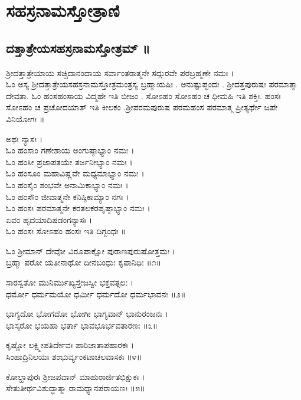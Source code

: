 \fancyhead[RL]{}
\chapter*{\center ಸಹಸ್ರನಾಮಸ್ತೋತ್ರಾಣಿ}
\section{ದತ್ತಾತ್ರೇಯಸಹಸ್ರನಾಮಸ್ತೋತ್ರಮ್ ॥}
ಶ್ರೀದತ್ತಾತ್ರೇಯಾಯ ಸಚ್ಚಿದಾನಂದಾಯ ಸರ್ವಾಂತರಾತ್ಮನೇ ಸದ್ಗುರವೇ ಪರಬ್ರಹ್ಮಣೇ ನಮಃ ।\\
ಓಂ ಅಸ್ಯ ಶ್ರೀದತ್ತಾತ್ರೇಯಸಹಸ್ರನಾಮಸ್ತೋತ್ರಮಂತ್ರಸ್ಯ ಬ್ರಹ್ಮಾಋಷಿಃ . ಅನುಷ್ಟುಪ್ಛಂದಃ . ಶ್ರೀದತ್ತಪುರುಷಃ ಪರಮಾತ್ಮಾ ದೇವತಾ. ಓಂ ಹಂಸಹಂಸಾಯ ವಿದ್ಮಹೇ ಇತಿ ಬೀಜಂ . ಸೋಽಹಂ ಸೋಽಹಂ ಚ ಧೀಮಹಿ ಇತಿ ಶಕ್ತಿಃ. ಹಂಸಃ ಸೋಽಹಂ ಚ ಪ್ರಚೋದಯಾತ್ ಇತಿ ಕೀಲಕಂ .ಶ್ರೀಪರಮಪುರುಷ ಪರಮಹಂಸ ಪರಮಾತ್ಮ ಪ್ರೀತ್ಯರ್ಥೇ ಜಪೇ ವಿನಿಯೋಗಃ ॥

ಅಥಃ ನ್ಯಾಸಃ ।\\
ಓಂ ಹಂಸಾಂ ಗಣೇಶಾಯ ಅಂಗುಷ್ಠಾಭ್ಯಾಂ ನಮಃ ।\\
ಓಂ ಹಂಸೀ ಪ್ರಜಾಪತಯೇ ತರ್ಜನೀಭ್ಯಾಂ ನಮಃ ।\\
ಓಂ ಹಂಸೂಂ ಮಹಾವಿಷ್ಣವೇ ಮಧ್ಯಮಾಭ್ಯಾಂ ನಮಃ ।\\
ಓಂ ಹಂಸೈಂ ಶಂಭವೇ ಅನಾಮಿಕಾಭ್ಯಾಂ ನಮಃ ।\\
ಓಂ ಹಂಸೌಂ ಜೀವಾತ್ಮನೇ ಕನಿಷ್ಠಿಕಾಮ್ಯಾಂ ನಗಃ ।\\
ಓಂ ಹಂಸಃ ಪರಮಾತ್ಮನೇ ಕರತಲಕರಪೃಷ್ಠಾಭ್ಯಾಂ ನಮಃ ।\\
ಏವಂ ಹೃದಯಾದಿಷಡಂಗನ್ಯಾಸಃ ।\\
ಓಂ ಹಂಸಃ ಸೋಽಹಂ ಹಂಸಃ ಇತಿ ದಿಗ್ಬಂಧಃ ॥


ಓಂ ಶ್ರೀಮಾನ್ ದೇವೋ ವಿರೂಪಾಕ್ಷೋ ಪುರಾಣಪುರುಷೋತ್ತಮಃ ।\\
ಬ್ರಹ್ಮಾ ಪರೋ ಯತೀನಾಥೋ ದೀನಬಂಧುಃ ಕೃಪಾನಿಧಿಃ ॥೧॥

ಸಾರಸ್ವತೋ ಮುನಿರ್ಮುಖ್ಯಸ್ತೇಜಸ್ವೀ ಭಕ್ತವತ್ಸಲಃ ।\\
ಧರ್ಮೋ ಧರ್ಮಮಯೋ ಧರ್ಮೀ ಧರ್ಮದೋ ಧರ್ಮಭಾವನಃ ॥೨॥

ಭಾಗ್ಯದೋ ಭೋಗದೋ ಭೋಗೀ ಭಾಗ್ಯವಾನ್ ಭಾನುರಂಜನಃ ।\\
ಭಾಸ್ಕರೋ ಭಯಹಾ ಭರ್ತಾ ಭಾವಭೂರ್ಭವತಾರಣಃ ॥೩॥

ಕೃಷ್ಣೋ ಲಕ್ಷ್ಮೀಪತಿರ್ದೇವಃ ಪಾರಿಜಾತಾಪಹಾರಕಃ ।\\
ಸಿಂಹಾದ್ರಿನಿಲಯಃ ಶಂಭುರ್ವ್ಯಂಕಟಾಚಲವಾಸಕಃ ॥೪॥

ಕೋಲ್ಹಾಪುರಃ ಶ್ರೀಜಪವಾನ್ ಮಾಹುರಾರ್ಜಿತಭಿಕ್ಷುಕಃ ।\\
ಸೇತುತೀರ್ಥವಿಶುದ್ಧಾತ್ಮಾ ರಾಮಧ್ಯಾನಪರಾಯಣಃ ॥೫॥

